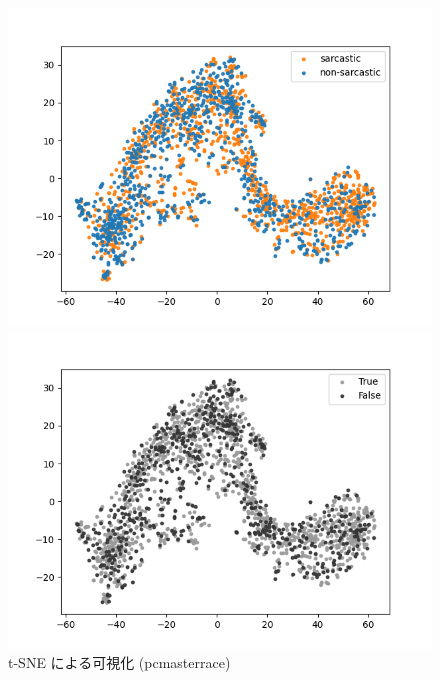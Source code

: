 \begin{figure}[tb]
\begin{center}
 	\begin{minipage}{0.4\hsize}
	\begin{center}
\includegraphics[width=\linewidth]{./figure/tsne_sarc_pc.png}
	\end{center}
	\end{minipage}
 	\begin{minipage}{0.4\hsize}
	\begin{center}
\includegraphics[width=\linewidth]{./figure/tsne_TorF_pc.png}
 	 \end{center}
 	\end{minipage}
	\caption{t-SNE による可視化 (pcmasterrace)}
	\label{fig:40_tsne4}
\end{center}
\end{figure}

